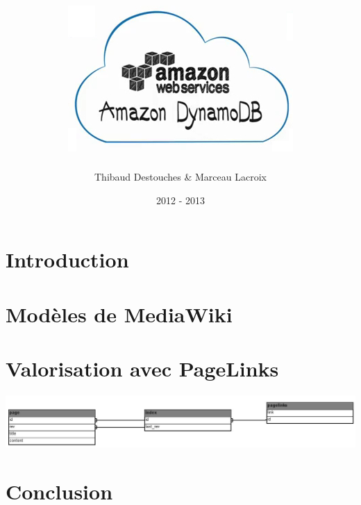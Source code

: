 \documentclass{article}
\title{\includegraphics{mdb}}
\author{Thibaud Destouches \& Marceau Lacroix}
\date{2012 - 2013}
\begin{document}
\begin{titlepage}
\maketitle
\tableofcontents
\end{titlepage}

\newpage
\section{Introduction}


\section{Modèles de MediaWiki}

\section{Valorisation avec PageLinks}
\includegraphics[scale=0.28]{db}

\section{Conclusion}
\end{document}
